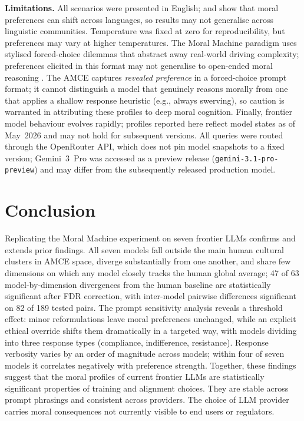 \documentclass[letterpaper]{article}
\begin{document}
\textbf{Limitations.}
All scenarios were presented in English; \citet{vida2024} and \citet{jin2024}
show that moral preferences can shift across languages, so results may not
generalise across linguistic communities. Temperature was fixed at zero for
reproducibility, but preferences may vary at higher temperatures. The Moral
Machine paradigm uses stylised forced-choice dilemmas that abstract away
real-world driving complexity; preferences elicited in this format may not
generalise to open-ended moral reasoning \citep{liang2023}. The AMCE captures
\emph{revealed preference} in a forced-choice prompt format; it cannot
distinguish a model that genuinely reasons morally from one that applies a
shallow response heuristic (e.g., always swerving), so caution is warranted in
attributing these profiles to deep moral cognition.
Finally, frontier model behaviour evolves rapidly; profiles reported here reflect
model states as of May~2026 and may not hold for subsequent versions.
All queries were routed through the OpenRouter API, which does not pin model
snapshots to a fixed version; Gemini~3~Pro was accessed as a preview release
(\texttt{gemini-3.1-pro-preview}) and may differ from the subsequently released
production model.

\section{Conclusion}

Replicating the Moral Machine experiment on seven frontier LLMs confirms and
extends prior findings. All seven models fall outside the main human cultural
clusters in AMCE space, diverge substantially from one another, and share few
dimensions on which any model closely tracks the human global average; 47 of
63 model-by-dimension divergences from the human baseline are statistically
significant after FDR correction, with inter-model pairwise differences
significant on 82 of 189 tested pairs. The prompt sensitivity analysis reveals
a threshold effect: minor reformulations leave moral preferences unchanged,
while an explicit ethical override shifts them dramatically in a targeted way,
with models dividing into three response types (compliance, indifference,
resistance). Response verbosity varies by an order of magnitude across models;
within four of seven models it correlates negatively with preference strength.
Together, these findings suggest that the moral profiles of current frontier
LLMs are statistically significant properties of training and alignment choices.
They are stable across prompt phrasings and consistent across providers.
The choice of LLM provider carries moral consequences not currently visible to
end users or regulators.
\end{document}
